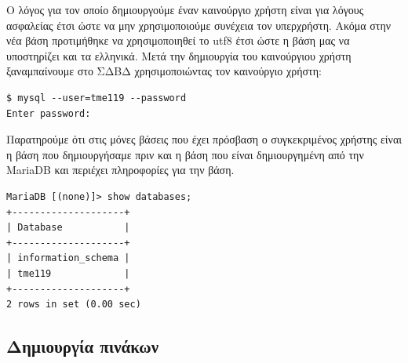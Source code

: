 \documentclass{assignment}
\begin{document}
Ο λόγος για τον οποίο δημιουργούμε έναν καινούργιο χρήστη είναι για λόγους ασφαλείας έτσι ώστε να μην χρησιμοποιούμε συνέχεια τον υπερχρήστη. Ακόμα στην νέα βάση προτιμήθηκε να χρησιμοποιηθεί το utf8 έτσι ώστε η βάση μας να υποστηρίζει και τα ελληνικά. Μετά την δημιουργία του καινούργιου χρήστη ξαναμπαίνουμε στο ΣΔΒΔ χρησιμοποιώντας τον καινούργιο χρήστη:

\begin{verbatim}
$ mysql --user=tme119 --password
Enter password: 
\end{verbatim} 


Παρατηρούμε ότι στις μόνες βάσεις που έχει πρόσβαση ο συγκεκριμένος χρήστης είναι η βάση που δημιουργήσαμε πριν και η βάση που είναι δημιουργημένη από την MariaDB και περιέχει πληροφορίες για την βάση.

\begin{verbatim}
MariaDB [(none)]> show databases;
+--------------------+
| Database           |
+--------------------+
| information_schema |
| tme119             |
+--------------------+
2 rows in set (0.00 sec)
\end{verbatim}

\subsection{Δημιουργία πινάκων}
\end{document}
